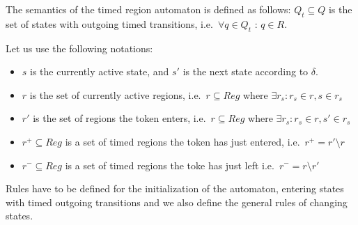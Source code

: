 			
			The semantics of the timed region automaton is defined as follows:
			$Q_t \subseteq Q$ is the set of states with outgoing timed transitions, 
			i.e.~$\forall q \in Q_t$ : $ q \in R $. 
			
			
			Let us use the following notations: 
			
			\begin{itemize}
				\item $s$ is the currently active state, and $s'$ is the next state according to $\delta$.		
				\item $r$ is the set of currently active regions, i.e.~$r \subseteq \mathit{Reg}$ where $\exists r_s : r_s \in r, s \in r_s $ 
				\item $r'$ is the set of regions the token enters, i.e.~$r \subseteq \mathit{Reg}$ where $\exists r_s :  r_s \in r, s' \in r_s $ 
				\item $r^+ \subseteq \mathit{Reg}$ is a set of timed regions the token has just entered, i.e.~$r^+ = r' \setminus r$ 
				\item $r^- \subseteq \mathit{Reg}$ is a set of timed regions the toke has just left i.e.~$r^- = r \setminus r'$
			\end{itemize}
			
			Rules  have to be defined for the initialization of the automaton, entering states with timed outgoing transitions and we also define the general rules of changing states. 
			
